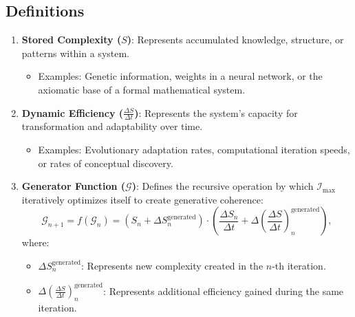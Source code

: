 \documentclass[12pt]{article}
\begin{document}
\subsection{Definitions}
\begin{enumerate}
    \item \textbf{Stored Complexity (\(S\))}: Represents accumulated knowledge, structure, or patterns within a system.
        \begin{itemize}
            \item Examples: Genetic information, weights in a neural network, or the axiomatic base of a formal mathematical system.
        \end{itemize}
    \item \textbf{Dynamic Efficiency (\(\frac{\Delta S}{\Delta t}\))}: Represents the system’s capacity for transformation and adaptability over time.
        \begin{itemize}
            \item Examples: Evolutionary adaptation rates, computational iteration speeds, or rates of conceptual discovery.
        \end{itemize}
    \item \textbf{Generator Function (\(\mathcal{G}\))}: Defines the recursive operation by which \(\mathcal{I}_{\text{max}}\) iteratively optimizes itself to create generative coherence:
        \[
        \mathcal{G}_{n+1} = f(\mathcal{G}_n) = \left(S_n + \Delta S_n^{\text{generated}}\right) \cdot \left(\frac{\Delta S_n}{\Delta t} + \Delta \left(\frac{\Delta S}{\Delta t}\right)_n^{\text{generated}}\right),
        \]
        where:
        \begin{itemize}
            \item \(\Delta S_n^{\text{generated}}\): Represents new complexity created in the \(n\)-th iteration.
            \item \(\Delta \left(\frac{\Delta S}{\Delta t}\right)_n^{\text{generated}}\): Represents additional efficiency gained during the same iteration.
        \end{itemize}
\end{enumerate}
\end{document}
